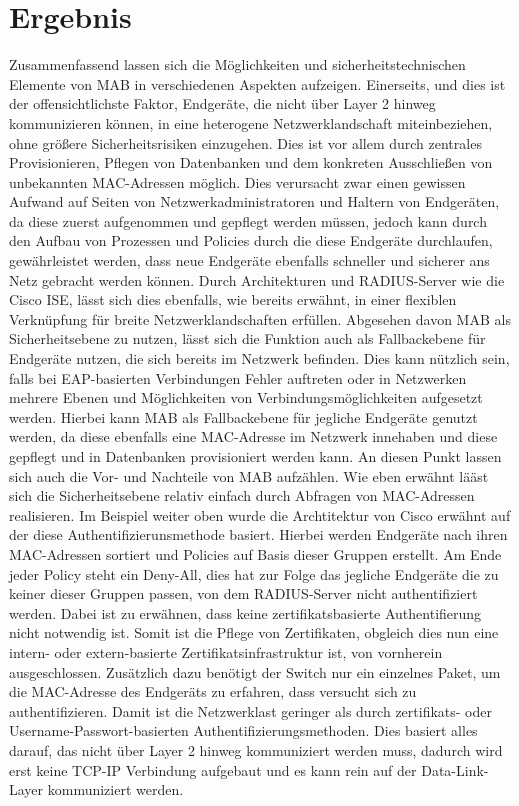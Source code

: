 \documentclass[conference]{IEEEtran}
\begin{document}
%

\section{Ergebnis}
Zusammenfassend lassen sich die Möglichkeiten und sicherheitstechnischen Elemente von MAB in verschiedenen Aspekten aufzeigen. Einerseits, und dies ist der offensichtlichste Faktor, Endgeräte, die nicht über Layer 2 hinweg kommunizieren können, in eine heterogene Netzwerklandschaft miteinbeziehen, ohne größere Sicherheitsrisiken einzugehen. Dies ist vor allem durch zentrales Provisionieren, Pflegen von Datenbanken und dem konkreten Ausschließen von unbekannten MAC-Adressen möglich. Dies verursacht zwar einen gewissen Aufwand auf Seiten von Netzwerkadministratoren und Haltern von Endgeräten, da diese zuerst aufgenommen und gepflegt werden müssen, jedoch kann durch den Aufbau von Prozessen und Policies durch die diese Endgeräte durchlaufen, gewährleistet werden, dass neue Endgeräte ebenfalls schneller und sicherer ans Netz gebracht werden können. Durch Architekturen und RADIUS-Server wie die Cisco ISE, lässt sich dies ebenfalls, wie bereits erwähnt, in einer flexiblen Verknüpfung für breite Netzwerklandschaften erfüllen. Abgesehen davon MAB als Sicherheitsebene zu nutzen, lässt sich die Funktion auch als Fallbackebene für Endgeräte nutzen, die sich bereits im Netzwerk befinden. Dies kann nützlich sein, falls bei EAP-basierten Verbindungen Fehler auftreten oder in Netzwerken mehrere Ebenen und Möglichkeiten von Verbindungsmöglichkeiten aufgesetzt werden. Hierbei kann MAB als Fallbackebene für jegliche Endgeräte genutzt werden, da diese ebenfalls eine MAC-Adresse im Netzwerk innehaben und diese gepflegt und in Datenbanken provisioniert werden kann. 
%
An diesen Punkt lassen sich auch die Vor- und Nachteile von MAB aufzählen. Wie eben erwähnt lääst sich die Sicherheitsebene relativ einfach durch Abfragen von MAC-Adressen realisieren. Im Beispiel weiter oben wurde die Archtitektur von Cisco erwähnt auf der diese Authentifizierunsmethode basiert. Hierbei werden Endgeräte nach ihren MAC-Adressen sortiert und Policies auf Basis dieser Gruppen erstellt. Am Ende jeder Policy steht ein Deny-All, dies hat zur Folge das jegliche Endgeräte die zu keiner dieser Gruppen passen, von dem RADIUS-Server nicht authentifiziert werden. Dabei ist zu erwähnen, dass keine zertifikatsbasierte Authentifierung nicht notwendig ist. Somit ist die Pflege von Zertifikaten, obgleich dies nun eine intern- oder extern-basierte Zertifikatsinfrastruktur ist, von vornherein ausgeschlossen. Zusätzlich dazu benötigt der Switch nur ein einzelnes Paket, um die MAC-Adresse des Endgeräts zu erfahren, dass versucht sich zu authentifizieren. Damit ist die Netzwerklast geringer als durch zertifikats- oder Username-Passwort-basierten Authentifizierungsmethoden. Dies basiert alles darauf, das nicht über Layer 2 hinweg kommuniziert werden muss, dadurch wird erst keine TCP-IP Verbindung aufgebaut und es kann rein auf der Data-Link-Layer kommuniziert werden. 
\end{document}
